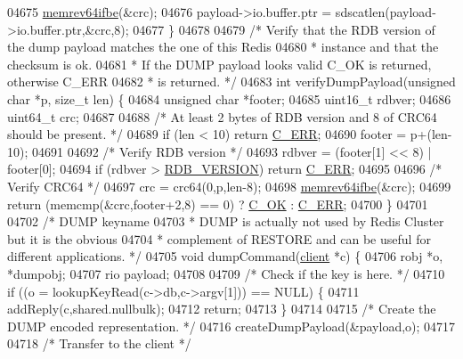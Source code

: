 \begin{DoxyCode}
{{{{{{{{{{{{{{{{{{{{{{{{{{{{{{{{{{{{{{{{{{{{{{{{{{{{{{{{{{{{{{{{{{{{{{{{{{{{{{{{{{{{{{{{{{{{{{{{{{{{{{{{{{04675     \hyperlink{endianconv_8h_aa311b9f944c3b988f3601698a95890c1}{memrev64ifbe}(&crc);
04676     payload->io.buffer.ptr = sdscatlen(payload->io.buffer.ptr,&crc,8);
04677 \}
04678 
04679 \textcolor{comment}{/* Verify that the RDB version of the dump payload matches the one of this Redis}
04680 \textcolor{comment}{ * instance and that the checksum is ok.}
04681 \textcolor{comment}{ * If the DUMP payload looks valid C\_OK is returned, otherwise C\_ERR}
04682 \textcolor{comment}{ * is returned. */}
04683 \textcolor{keywordtype}{int} verifyDumpPayload(\textcolor{keywordtype}{unsigned} \textcolor{keywordtype}{char} *p, size\_t len) \{
04684     \textcolor{keywordtype}{unsigned} \textcolor{keywordtype}{char} *footer;
04685     uint16\_t rdbver;
04686     uint64\_t crc;
04687 
04688     \textcolor{comment}{/* At least 2 bytes of RDB version and 8 of CRC64 should be present. */}
04689     \textcolor{keywordflow}{if} (len < 10) \textcolor{keywordflow}{return} \hyperlink{server_8h_af98ac28d5f4d23d7ed5985188e6fb7d1}{C\_ERR};
04690     footer = p+(len-10);
04691 
04692     \textcolor{comment}{/* Verify RDB version */}
04693     rdbver = (footer[1] << 8) | footer[0];
04694     \textcolor{keywordflow}{if} (rdbver > \hyperlink{rdb_8h_ae34418fdbb9794fb7558a4f58bdc1cad}{RDB\_VERSION}) \textcolor{keywordflow}{return} \hyperlink{server_8h_af98ac28d5f4d23d7ed5985188e6fb7d1}{C\_ERR};
04695 
04696     \textcolor{comment}{/* Verify CRC64 */}
04697     crc = crc64(0,p,len-8);
04698     \hyperlink{endianconv_8h_aa311b9f944c3b988f3601698a95890c1}{memrev64ifbe}(&crc);
04699     \textcolor{keywordflow}{return} (memcmp(&crc,footer+2,8) == 0) ? \hyperlink{server_8h_a303769ef1065076e68731584e758d3e1}{C\_OK} : \hyperlink{server_8h_af98ac28d5f4d23d7ed5985188e6fb7d1}{C\_ERR};
04700 \}
04701 
04702 \textcolor{comment}{/* DUMP keyname}
04703 \textcolor{comment}{ * DUMP is actually not used by Redis Cluster but it is the obvious}
04704 \textcolor{comment}{ * complement of RESTORE and can be useful for different applications. */}
04705 \textcolor{keywordtype}{void} dumpCommand(\hyperlink{structclient}{client} *c) \{
04706     robj *o, *dumpobj;
04707     rio payload;
04708 
04709     \textcolor{comment}{/* Check if the key is here. */}
04710     \textcolor{keywordflow}{if} ((o = lookupKeyRead(c->db,c->argv[1])) == NULL) \{
04711         addReply(c,shared.nullbulk);
04712         \textcolor{keywordflow}{return};
04713     \}
04714 
04715     \textcolor{comment}{/* Create the DUMP encoded representation. */}
04716     createDumpPayload(&payload,o);
04717 
04718     \textcolor{comment}{/* Transfer to the client */}
}}}}}}}}}}}}}}}}}}}}}}}}}}}}}}}}}}}}}}}}}}}}}}}}}}}}}}}}}}}}}}}}}}}}}}}}}}}}}}}}}}}}}}}}}}}}}}}}}}}}}}}}}}
\end{DoxyCode}
